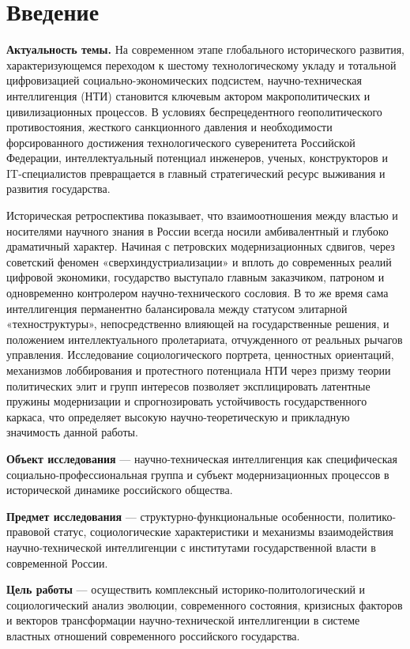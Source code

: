\section*{Введение}

\textbf{Актуальность темы.} На современном этапе глобального исторического развития, характеризующемся переходом к шестому технологическому укладу и тотальной цифровизацией социально-экономических подсистем, научно-техническая интеллигенция (НТИ) становится ключевым актором макрополитических и цивилизационных процессов. В условиях беспрецедентного геополитического противостояния, жесткого санкционного давления и необходимости форсированного достижения технологического суверенитета Российской Федерации, интеллектуальный потенциал инженеров, ученых, конструкторов и IT-специалистов превращается в главный стратегический ресурс выживания и развития государства. 

Историческая ретроспектива показывает, что взаимоотношения между властью и носителями научного знания в России всегда носили амбивалентный и глубоко драматичный характер. Начиная с петровских модернизационных сдвигов, через советский феномен «сверхиндустриализации» и вплоть до современных реалий цифровой экономики, государство выступало главным заказчиком, патроном и одновременно контролером научно-технического сословия. В то же время сама интеллигенция перманентно балансировала между статусом элитарной «техноструктуры», непосредственно влияющей на государственные решения, и положением интеллектуального пролетариата, отчужденного от реальных рычагов управления. Исследование социологического портрета, ценностных ориентаций, механизмов лоббирования и протестного потенциала НТИ через призму теории политических элит и групп интересов позволяет эксплицировать латентные пружины модернизации и спрогнозировать устойчивость государственного каркаса, что определяет высокую научно-теоретическую и прикладную значимость данной работы.

\textbf{Объект исследования} --- научно-техническая интеллигенция как специфическая социально-профессиональная группа и субъект модернизационных процессов в исторической динамике российского общества.

\textbf{Предмет исследования} --- структурно-функциональные особенности, политико-правовой статус, социологические характеристики и механизмы взаимодействия научно-технической интеллигенции с институтами государственной власти в современной России.

\textbf{Цель работы} --- осуществить комплексный историко-политологический и социологический анализ эволюции, современного состояния, кризисных факторов и векторов трансформации научно-технической интеллигенции в системе властных отношений современного российского государства.

